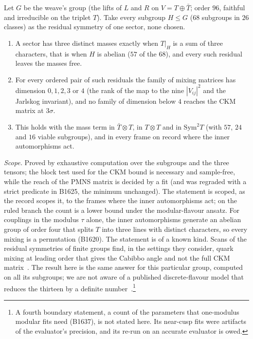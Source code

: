\begin{theorem}[N2; B1620, B1625]\label{bd:reducesnone}
Let $G$ be the weave's group (the lifts of $L$ and $R$ on $V=T\oplus\bar T$; order $96$, faithful and irreducible on the
triplet $T$). Take every subgroup $H\le G$ ($68$ subgroups in $26$ classes) as the residual symmetry of one sector, none
chosen.
\begin{enumerate}
\item A sector has three distinct masses exactly when $T|_H$ is a sum of three characters, that is when $H$ is abelian ($57$
  of the $68$), and every such residual leaves the masses free.
\item For every ordered pair of such residuals the family of mixing matrices has dimension $0,1,2,3$ or $4$ (the rank of
  the map to the nine $|V_{ij}|^2$ and the Jarlskog invariant), and no family of dimension below $4$ reaches the CKM
  matrix at $3\sigma$.
\item This holds with the mass term in $\bar T\otimes T$, in $T\otimes T$ and in $\mathrm{Sym}^2T$ (with $57$, $24$ and
  $16$ viable subgroups), and in every frame on record where the inner automorphisms act.
\end{enumerate}
\end{theorem}

\emph{Scope.} Proved by exhaustive computation over the subgroups and the three tensors; the block test used for the
CKM bound is necessary and sample-free, while the reach of the PMNS matrix is decided by a fit (and was regraded with
a strict predicate in B1625, the minimum unchanged). The statement is scoped, as the record scopes it, to the frames
where the inner automorphisms act; on the ruled branch the count is a lower bound under the modular-flavour ansatz. For
couplings in the modulus $\tau$ alone, the inner automorphisms generate an abelian group of order four that splits $T$
into three lines with distinct characters, so every mixing is a permutation (B1620). The statement is of a known kind. Scans
of the residual symmetries of finite groups find, in the settings they consider, quark mixing at leading order that gives
the Cabibbo angle and not the full CKM matrix~\cite{HolthausenLim2013,YaoDing2015}. The result here is the same answer for
this particular group, computed on all its subgroups; we are not aware of a published discrete-flavour model that
reduces the thirteen by a definite number~\cite{Feruglio2019,NovichkovPenedoPetcov2021}.\footnote{A fourth boundary statement, a count of the
parameters that one-modulus modular fits need (B1637), is not stated here. Its near-cusp fits were artifacts of the
evaluator's precision, and its re-run on an accurate evaluator is owed.}

